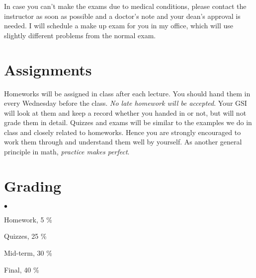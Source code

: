 \documentclass[margin,line]{res}
\newenvironment{list2}{
  \begin{list}{$\bullet$}{%
      \setlength{\itemsep}{0in}
      \setlength{\parsep}{0in} \setlength{\parskip}{0in}
      \setlength{\topsep}{0in} \setlength{\partopsep}{0in}
      \setlength{\leftmargin}{0.2in}}}{\end{list}}
\begin{document}
\begin{resume}
In case you can't make  the exams due to medical conditions, please contact the
instructor as soon as possible and a doctor's note and your dean's approval is needed.
I will schedule a make up exam for you in my office, which will use slightly different
problems from the normal exam.


\section{\sc Assignments}
Homeworks will be assigned in class after each lecture. You should hand them in
every Wednesday before the class. \emph{No late homework will be accepted}.
Your GSI will look at them and keep a record whether you handed in or not,
but will not grade them in detail.
Quizzes and exams will be similar to the examples we
do in class and closely related to homeworks. Hence you are strongly encouraged
to work them through and understand them well by yourself.
As another general principle in math,
\emph{practice makes perfect}.

\section{\sc Grading}
\begin{list2}
\item Homework, 5 \%
\item Quizzes, 25 \%
\item Mid-term, 30 \%
\item Final, 40 \%
\end{list2}


\end{resume}
\end{document}
